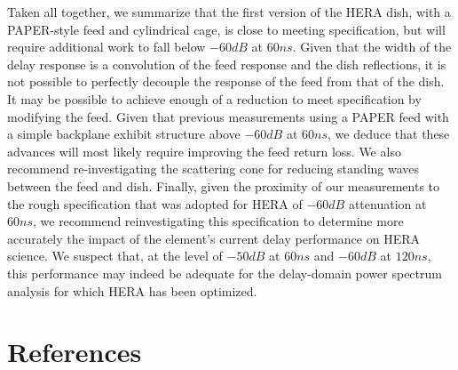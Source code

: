 \documentclass[12pt,preprint]{aastex}
\begin{document}
Taken all together, we summarize that the first version of the HERA dish, with a PAPER-style feed and cylindrical cage, is close to meeting
specification, but will require additional work to fall below $-60dB$ at $60ns$.  Given that the width of the delay response is a convolution
of the feed response and the dish reflections, it is not possible to perfectly decouple the response of the feed from that of the dish.
It may be possible to achieve enough of a reduction to meet specification by modifying the feed.
Given that previous measurements using a PAPER feed with a simple backplane exhibit structure above $-60dB$ at $60ns$,
we deduce that these advances will most likely require improving the feed return loss.  We also recommend re-investigating the scattering
cone for reducing standing waves between the feed and dish.  Finally, given the proximity of our measurements to the rough 
specification that was adopted for 
HERA of $-60dB$ attenuation at $60ns$, we recommend reinvestigating this specification to determine more accurately the impact of 
the element's current delay performance on HERA science.  We suspect that, at the level of $-50dB$ at $60ns$ and $-60dB$ at $120ns$, this
performance may indeed be adequate for the delay-domain power spectrum analysis for which HERA has been optimized.

\section{References}
\end{document}
